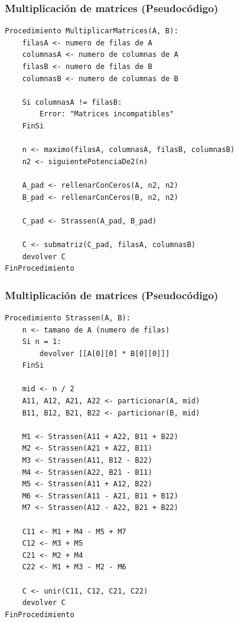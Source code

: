 \documentclass[10pt]{beamer}
\begin{document}
    \begin{frame}[fragile]
        \frametitle{Multiplicación de matrices (Pseudocódigo)}
        \begin{lstlisting}[basicstyle=\ttfamily\scriptsize]
Procedimiento MultiplicarMatrices(A, B):
    filasA <- numero de filas de A
    columnasA <- numero de columnas de A
    filasB <- numero de filas de B
    columnasB <- numero de columnas de B

    Si columnasA != filasB:
        Error: "Matrices incompatibles"
    FinSi

    n <- maximo(filasA, columnasA, filasB, columnasB)
    n2 <- siguientePotenciaDe2(n)

    A_pad <- rellenarConCeros(A, n2, n2)
    B_pad <- rellenarConCeros(B, n2, n2)

    C_pad <- Strassen(A_pad, B_pad)

    C <- submatriz(C_pad, filasA, columnasB)
    devolver C
FinProcedimiento
        \end{lstlisting}
    \end{frame}
    \begin{frame}[fragile]
        \frametitle{Multiplicación de matrices (Pseudocódigo)}
        \begin{lstlisting}[basicstyle=\ttfamily\scriptsize]
Procedimiento Strassen(A, B):
    n <- tamano de A (numero de filas)
    Si n = 1:
        devolver [[A[0][0] * B[0][0]]]
    FinSi

    mid <- n / 2
    A11, A12, A21, A22 <- particionar(A, mid)
    B11, B12, B21, B22 <- particionar(B, mid)

    M1 <- Strassen(A11 + A22, B11 + B22)
    M2 <- Strassen(A21 + A22, B11)
    M3 <- Strassen(A11, B12 - B22)
    M4 <- Strassen(A22, B21 - B11)
    M5 <- Strassen(A11 + A12, B22)
    M6 <- Strassen(A11 - A21, B11 + B12)
    M7 <- Strassen(A12 - A22, B21 + B22)

    C11 <- M1 + M4 - M5 + M7
    C12 <- M3 + M5
    C21 <- M2 + M4
    C22 <- M1 + M3 - M2 - M6

    C <- unir(C11, C12, C21, C22)
    devolver C
FinProcedimiento
        \end{lstlisting}
    \end{frame}
\end{document}
